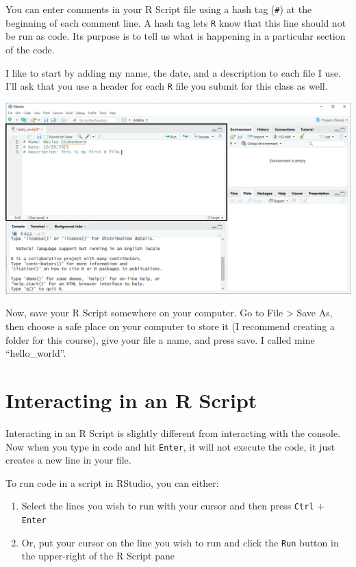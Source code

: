 \documentclass[
]{book}
\providecommand{\tightlist}{%
  \setlength{\itemsep}{0pt}\setlength{\parskip}{0pt}}
\begin{document}
You can enter comments in your R Script file using a hash tag (\texttt{\#}) at the beginning of each comment line. A hash tag lets \texttt{R} know that this line should not be run as code. Its purpose is to tell us what is happening in a particular section of the code.

I like to start by adding my name, the date, and a description to each file I use. I'll ask that you use a header for each \texttt{R} file you submit for this class as well.

\includegraphics{docs/_main_files/figure-html/RStudio_Commenting in an R Script file.png}

Now, save your R Script somewhere on your computer. Go to File \textgreater{} Save As, then choose a safe place on your computer to store it (I recommend creating a folder for this course), give your file a name, and press save. I called mine ``hello\_world''.

\hypertarget{interacting-in-an-r-script}{%
\section{Interacting in an R Script}\label{interacting-in-an-r-script}}

Interacting in an R Script is slightly different from interacting with the console. Now when you type in code and hit \texttt{Enter}, it will not execute the code, it just creates a new line in your file.

To run code in a script in RStudio, you can either:

\begin{enumerate}
\def\labelenumi{\arabic{enumi}.}
\tightlist
\item
  Select the lines you wish to run with your cursor and then press \texttt{Ctrl} + \texttt{Enter}
\item
  Or, put your cursor on the line you wish to run and click the \texttt{Run} button in the upper-right of the R Script pane
\end{enumerate}
\end{document}
